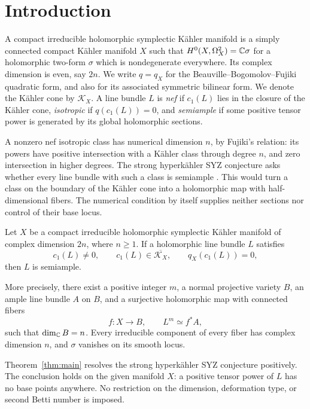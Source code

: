 \section{Introduction}

A compact irreducible holomorphic symplectic K\"ahler manifold is a
simply connected compact K\"ahler manifold $X$ such that
$H^0(X,\Omega_X^2)=\mathbb C\sigma$ for a holomorphic two-form $\sigma$
which is nondegenerate everywhere. Its complex dimension is even,
say $2n$. We write $q=q_X$ for the Beauville--Bogomolov--Fujiki
quadratic form, and also for its associated symmetric bilinear form.
We denote the K\"ahler cone by $\mathcal K_X$.
A line bundle $L$ is \emph{nef} if $c_1(L)$ lies in the closure of the
K\"ahler cone, \emph{isotropic} if $q(c_1(L))=0$, and
\emph{semiample} if some positive tensor power is generated by its
global holomorphic sections.

A nonzero nef isotropic class has numerical dimension $n$, by
Fujiki's relation: its powers have positive intersection with a
K\"ahler class through degree $n$, and zero intersection in higher
degrees. The strong hyperk\"ahler SYZ conjecture asks whether every
line bundle with such a class is semiample
\cite[Conjecture~1.7]{VerbitskySYZ}. This would turn a class on the
boundary of the K\"ahler cone into a holomorphic map with
half-dimensional fibers. The numerical condition by itself supplies
neither sections nor control of their base locus.

\begin{theorem}\label{thm:main}
Let $X$ be a compact irreducible holomorphic symplectic K\"ahler
manifold of complex dimension $2n$, where $n\ge1$. If a holomorphic
line bundle $L$ satisfies
\[
 c_1(L)\ne0,\qquad c_1(L)\in\overline{\mathcal K_X},
                  \qquad q_X(c_1(L))=0,
\]
then $L$ is semiample.

More precisely, there exist a positive integer $m$, a normal
projective variety $B$, an ample line bundle $A$ on $B$, and a
surjective holomorphic map with connected fibers
\[
                 f:X\longrightarrow B,\qquad L^m\simeq f^*A,
\]
such that $\dim_{\mathbb C}B=n$. Every irreducible component of every
fiber has complex dimension $n$, and $\sigma$ vanishes on its
smooth locus.
\end{theorem}

Theorem~\ref{thm:main} resolves the strong hyperk\"ahler SYZ
conjecture positively. The conclusion holds on the given manifold
$X$: a positive tensor power of $L$ has no base points anywhere.
No restriction on the dimension, deformation type, or second Betti
number is imposed.


